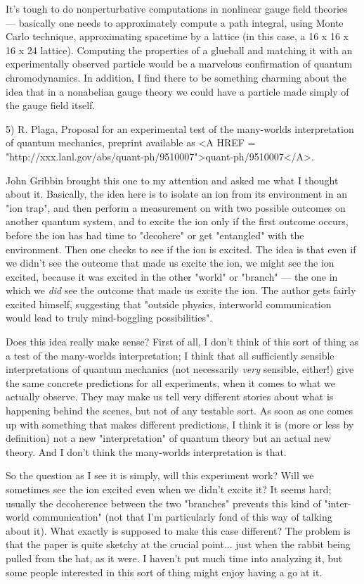 It's tough to do nonperturbative computations in nonlinear gauge field
theories --- basically one needs to approximately compute a path
integral, using Monte Carlo technique, approximating spacetime by a
lattice (in this case, a 16 x 16 x 16 x 24 lattice).  Computing the
properties of a glueball and matching it with an experimentally observed
particle would be a marvelous confirmation of quantum chromodynamics.
In addition, I find there to be something charming about the idea that
in a nonabelian gauge theory we could have a particle made simply of the
gauge field itself.  


5) R. Plaga, Proposal for an experimental test of the many-worlds
interpretation of quantum mechanics, preprint available as
<A HREF = "http://xxx.lanl.gov/abs/quant-ph/9510007">quant-ph/9510007</A>.

John Gribbin brought this one to my attention and asked me what I
thought about it.  Basically, the idea here is to isolate an ion from
its environment in an "ion trap", and then perform a measurement on with
two possible outcomes on another quantum system, and to excite the ion
only if the first outcome occurs, before the ion has had time to
"decohere" or get "entangled" with the environment.  Then one checks to
see if the ion is excited.  The idea is that even if we didn't see the
outcome that made us excite the ion, we might see the ion excited,
because it was excited in the other "world" or "branch" --- the one in
which we \emph{did} see the outcome that made us excite the ion.  The author
gets fairly excited himself, suggesting that "outside physics,
interworld communication would lead to truly mind-boggling possibilities".

Does this idea really make sense?  First of all, I don't think of this
sort of thing as a test of the many-worlds interpretation; I think that
all sufficiently sensible interpretations of quantum mechanics (not
necessarily \emph{very} sensible, either!) give the same concrete predictions
for all experiments, when it comes to what we actually observe.  They
may make us tell very different stories about what is happening behind
the scenes, but not of any testable sort.  As soon as one comes up with
something that makes different predictions, I think it is (more or less
by definition) not a new "interpretation" of quantum theory but an
actual new theory.  And I don't think the many-worlds interpretation is
that.

So the question as I see it is simply, will this experiment work?  Will
we sometimes see the ion excited even when we didn't excite it?  It
seems hard; usually the decoherence between the two "branches" prevents
this kind of "inter-world communication" (not that I'm particularly fond
of this way of talking about it).  What exactly is supposed to make this
case different?  The problem is that the paper is quite sketchy at the
crucial point... just when the rabbit being pulled from the hat, as it
were.  I haven't put much time into analyzing it, but some people
interested in this sort of thing might enjoy having a go at it.



